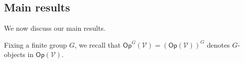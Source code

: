 \documentclass[a4paper,10pt
,draft
]{article}%
\numberwithin{equation}{section}
\numberwithin{figure}{section}
\theoremstyle{definition} %
\newcommand{\set}[1]{\left\{#1\right\}}%
\newcommand{\Sym}{\ensuremath{\mathsf{Sym}}}%
\newcommand{\Top}{\ensuremath{\mathsf{Top}}}
\newcommand{\sSet}{\ensuremath{\mathsf{sSet}}}%
\newcommand{\Op}{\mathsf{Op}}%
\newcommand{\F}{\ensuremath{\mathcal F}}
\newcommand{\V}{\ensuremath{\mathcal V}}
\renewcommand{\O}{\ensuremath{\mathcal O}}
\newcommand{\1}{\ensuremath{\mathbbm 1}}%
\begin{document}
\subsection{Main results}

We now discuss our main results.

Fixing a finite group $G$, we
recall that 
$\mathsf{Op}^G(\mathcal{V})
=
\left(\mathsf{Op}(\mathcal{V})\right)^G$
denotes $G$-objects in 
$\mathsf{Op}(\mathcal{V})$.



\end{document}
